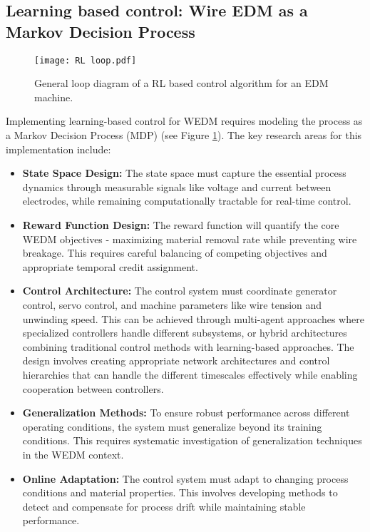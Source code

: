 \documentclass[11pt]{article}
\begin{document}
\subsection{Learning based control: Wire EDM as a Markov Decision Process}

\begin{figure}[h]
    \centering
    \texttt{[image: RL loop.pdf]}
    \caption{General loop diagram of a RL based control algorithm for an EDM machine.}
    \label{fig:RL_loop}
\end{figure}

Implementing learning-based control for WEDM requires modeling the process as a Markov Decision Process (MDP) (see Figure \ref{fig:RL_loop}). The key research areas for this implementation include:

\begin{itemize}
    \item \textbf{State Space Design:} The state space must capture the essential process dynamics through measurable signals like voltage and current between electrodes, while remaining computationally tractable for real-time control.
    
    \item \textbf{Reward Function Design:} The reward function will quantify the core WEDM objectives - maximizing material removal rate while preventing wire breakage. This requires careful balancing of competing objectives and appropriate temporal credit assignment.
    
    \item \textbf{Control Architecture:} The control system must coordinate generator control, servo control, and machine parameters like wire tension and unwinding speed. This can be achieved through multi-agent approaches where specialized controllers handle different subsystems, or hybrid architectures combining traditional control methods with learning-based approaches. The design involves creating appropriate network architectures and control hierarchies that can handle the different timescales effectively while enabling cooperation between controllers.
    \item \textbf{Generalization Methods:} To ensure robust performance across different operating conditions, the system must generalize beyond its training conditions. This requires systematic investigation of generalization techniques in the WEDM context.
    
    \item \textbf{Online Adaptation:} The control system must adapt to changing process conditions and material properties. This involves developing methods to detect and compensate for process drift while maintaining stable performance.
\end{itemize}
\end{document}
